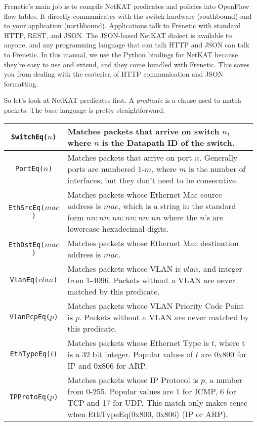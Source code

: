 Frenetic's main job is to compile NetKAT predicates and policies into OpenFlow flow tables.  
It directly communicates with the switch hardware (southbound) and to your application (northbound).
Applications talk to Frenetic with standard HTTP, REST, and JSON.
The JSON-based NetKAT dialect is available to anyone, and any programming language that can talk HTTP and 
JSON can talk to Frenetic.
In this manual, we use the Python bindings for NetKAT because they're easy to use and extend, and they
come bundled with Frenetic.  
This saves you from dealing with the esoterica of HTTP communication and JSON formatting.  

So let's look at NetKAT predicates first.  
A \textit{predicate} is a clause used to match packets.
The base language is pretty straightforward:

\bigskip
\begin{tabularx}{\linewidth}{|c|X|}
\hline\hline
\texttt{SwitchEq($n$)} & Matches packets that arrive on switch $n$, where $n$ is the Datapath ID of the switch.  
\\ \hline
\texttt{PortEq($n$)} & Matches packets that arrive on port $n$.  Generally ports are numbered 1-$m$, where $m$ is the
number of interfaces, but they don't need to be consecutive.  
\\ \hline
\texttt{EthSrcEq($mac$)} & Matches packets whose Ethernet Mac source address is $mac$, which is a string in the standard form $nn:nn:nn:nn:nn:nn$ where the $n$'s are lowercase hexadecimal digits.
\\ \hline
\texttt{EthDstEq($mac$)} & Matches packets whose Ethernet Mac destination address is $mac$.
\\ \hline
\texttt{VlanEq($vlan$)} & Matches packets whose VLAN is $vlan$, and integer from 1-4096.  Packets without a VLAN are never matched by this predicate.
\\ \hline
\texttt{VlanPcpEq($p$)} & Matches packets whose VLAN Priority Code Point is $p$.  Packets without a VLAN are never matched by this predicate.
\\ \hline
\texttt{EthTypeEq($t$)} & Matches packets whose Ethernet Type is $t$, where t is a 32 bit integer.  Popular values of $t$ are 0x800 for IP and 0x806 for ARP.  
\\ \hline
\texttt{IPProtoEq($p$)} & Matches packets whose IP Protocol is $p$, a number from 0-255.  
Popular values are 1 for ICMP, 6 for TCP and 17 for UDP.  
This match only makes sense when EthTypeEq(0x800, 0x806) (IP or ARP). 
\\ \hline

\end{tabularx}
